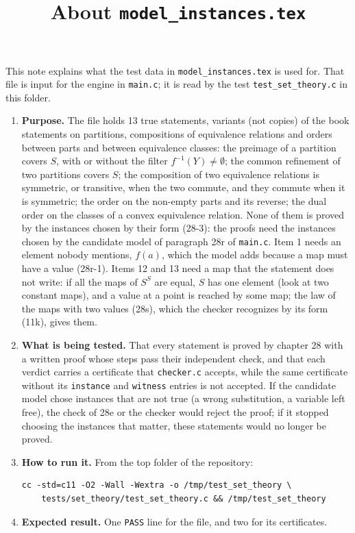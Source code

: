 \documentclass[11pt,a4paper]{article}
\title{About \texttt{model\_instances.tex}}
\author{}
\date{}
\begin{document}
\maketitle
This note explains what the test data in \texttt{model\_instances.tex} is used for. That file is input for the engine in \texttt{main.c}; it is read by the test \texttt{test\_set\_theory.c} in this folder.

\begin{enumerate}
\item \textbf{Purpose.} The file holds 13 true statements, variants (not copies) of the book statements on partitions, compositions of equivalence relations and orders between parts and between equivalence classes: the preimage of a partition covers $S$, with or without the filter $f^{-1}(Y) \neq \emptyset$; the common refinement of two partitions covers $S$; the composition of two equivalence relations is symmetric, or transitive, when the two commute, and they commute when it is symmetric; the order on the non-empty parts and its reverse; the dual order on the classes of a convex equivalence relation. None of them is proved by the instances chosen by their form (28-3): the proofs need the instances chosen by the candidate model of paragraph 28r of \texttt{main.c}. Item 1 needs an element nobody mentions, $f(a)$, which the model adds because a map must have a value (28r-1). Items 12 and 13 need a map that the statement does not write: if all the maps of $S^{S}$ are equal, $S$ has one element (look at two constant maps), and a value at a point is reached by some map; the law of the maps with two values (28s), which the checker recognizes by its form (11k), gives them.

\item \textbf{What is being tested.} That every statement is proved by chapter 28 with a written proof whose steps pass their independent check, and that each verdict carries a certificate that \texttt{checker.c} accepts, while the same certificate without its \texttt{instance} and \texttt{witness} entries is not accepted. If the candidate model chose instances that are not true (a wrong substitution, a variable left free), the check of 28e or the checker would reject the proof; if it stopped choosing the instances that matter, these statements would no longer be proved.

\item \textbf{How to run it.} From the top folder of the repository:
\begin{verbatim}
cc -std=c11 -O2 -Wall -Wextra -o /tmp/test_set_theory \
    tests/set_theory/test_set_theory.c && /tmp/test_set_theory
\end{verbatim}

\item \textbf{Expected result.} One \texttt{PASS} line for the file, and two for its certificates.
\end{enumerate}
\end{document}
